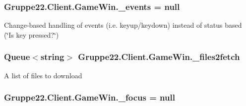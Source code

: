 \hypertarget{class_gruppe22_1_1_client_1_1_game_win_ac886290b54c21246ed1617e50858f4a2}{
\subsubsection[{\-\_\-events}]{ Gruppe22.\-Client.\-Game\-Win.\-\_\-events = null\hspace{0.3cm}{\ttfamily [protected]}}}\label{class_gruppe22_1_1_client_1_1_game_win_ac886290b54c21246ed1617e50858f4a2}


Change-\/based handling of events (i.\-e. keyup/keydown) instead of status based (\char`\"{}\-Is key pressed?\char`\"{}) 

\hypertarget{class_gruppe22_1_1_client_1_1_game_win_ab022cdc65543a866a781cdbc93882dd4}{
\subsubsection[{\-\_\-files2fetch}]{\setlength{\rightskip}{0pt plus 5cm}Queue$<$string$>$ Gruppe22.\-Client.\-Game\-Win.\-\_\-files2fetch\hspace{0.3cm}{\ttfamily [protected]}}}\label{class_gruppe22_1_1_client_1_1_game_win_ab022cdc65543a866a781cdbc93882dd4}


A list of files to download 

\hypertarget{class_gruppe22_1_1_client_1_1_game_win_a234b701077a7513f5a2f9d06bac40a17}{
\subsubsection[{\-\_\-focus}]{ Gruppe22.\-Client.\-Game\-Win.\-\_\-focus = null\hspace{0.3cm}{\ttfamily [protected]}}}\label{class_gruppe22_1_1_client_1_1_game_win_a234b701077a7513f5a2f9d06bac40a17}


